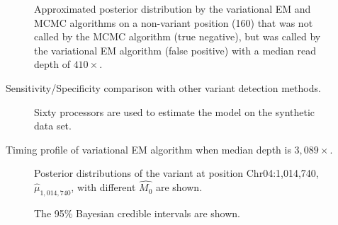 \documentclass{bmcart}
\begin{document}
\begin{backmatter}
\begin{figure}[h!]
\centering
\caption{Approximated posterior distribution by the variational EM and MCMC algorithms on a non-variant position (160) that was not called by the MCMC algorithm (true negative), but was called by the variational EM algorithm (false positive) with a median read depth of $410\times$.}\label{figure:compare2}
\end{figure}

\begin{table}[h!]
\centering
\caption{Sensitivity/Specificity comparison with other variant detection methods.}\label{table:character}
\end{table}%

\begin{figure}[h!]
\centering
\caption{
Sixty processors are used to estimate the model on the synthetic data set.}\label{figure:timing}
\end{figure}

\begin{table}[h!]
\centering
\caption{Timing profile of variational EM algorithm when median depth is $3,089\times$.}\label{table:timing}
\end{table}%

\vspace{1em}

\begin{figure}[h!]
\centering
\caption{
Posterior distributions of the variant at position Chr04:1,014,740, $\hat{\mu}_{1,014,740}$, with different $\hat{M_0}$ are shown.}
\label{tbl:M0}
\end{figure}

\vspace{1em}

\begin{figure}[h!]
\centering
\caption{
The 95\% Bayesian credible intervals are shown.}
\label{figure:concomitant}
\end{figure}


\setcounter{figure}{0}
\setcounter{table}{0}


\end{backmatter}
\end{document}
